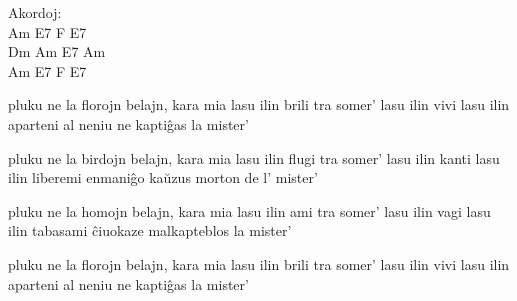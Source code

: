 \medskip

{\color{gray}Akordoj: \\
Am E7 F E7 \\
Dm Am E7 Am \\
Am E7 F E7}

\medskip

\begin{guitar}
  pluku ne la florojn belajn, kara mia
  lasu ilin brili tra somer'
  lasu ilin vivi
  lasu ilin aparteni al neniu
  ne kaptiĝas la mister'

  pluku ne la birdojn belajn, kara mia
  lasu ilin flugi tra somer'
  lasu ilin kanti
  lasu ilin liberemi
  enmaniĝo kaŭzus morton de l' mister'

  pluku ne la homojn belajn, kara mia
  lasu ilin ami tra somer'
  lasu ilin vagi
  lasu ilin tabasami
  ĉiuokaze malkapteblos la mister'

  pluku ne la florojn belajn, kara mia
  lasu ilin brili tra somer'
  lasu ilin vivi
  lasu ilin aparteni al neniu
  ne kaptiĝas la mister'
\end{guitar}
